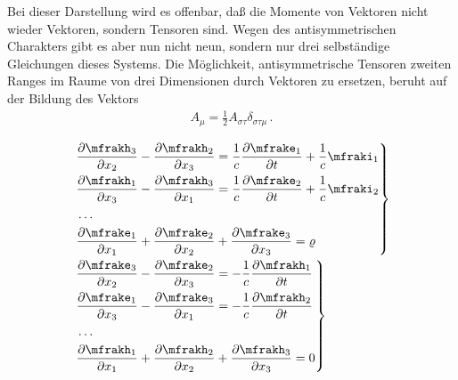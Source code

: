Bei dieser Darstellung wird es offenbar, daß die Momente von Vektoren nicht 
wieder Vektoren, sondern Tensoren sind. Wegen des antisymmetrischen Charakters 
gibt es aber nun nicht neun, sondern nur drei selbständige Gleichungen dieses 
Systems. Die Möglichkeit, antisymmetrische Tensoren zweiten Ranges im Raume
von drei Dimensionen durch Vektoren zu ersetzen, beruht auf der Bildung des 
Vektors
\begin{align*}
A_{\mu} = \frac{1}{2} A_{\sigma\tau} \delta_{\sigma\tau\mu}\,.
\end{align*}



\begin{align}
&\left.
\begin{aligned}
&\frpa{\mfrakh_3}{x_2} - \frpa{\mfrakh_2}{x_3} =
\frac{1}{c} \frpa{\mfrake_1}{t} + \frac{1}{c} \mfraki_1
\\
&\frpa{\mfrakh_1}{x_3} - \frpa{\mfrakh_3}{x_1} =
\frac{1}{c} \frpa{\mfrake_2}{t} + \frac{1}{c} \mfraki_2
\\
&\ldots
\\
&\frpa{\mfrake_1}{x_1} + \frpa{\mfrake_2}{x_2} + \frpa{\mfrake_3}{x_3} = \varrho
\end{aligned}
\right\}
\label{eq:19} \\
&\left.
\begin{aligned}
&\frpa{\mfrake_3}{x_2} - \frpa{\mfrake_2}{x_3} =
-\frac{1}{c} \frpa{\mfrakh_1}{t}
\\
&\frpa{\mfrake_1}{x_3} - \frpa{\mfrake_3}{x_1} =
-\frac{1}{c} \frpa{\mfrakh_2}{t}
\\
&\ldots
\\
&\frpa{\mfrakh_1}{x_1} + \frpa{\mfrakh_2}{x_2} + \frpa{\mfrakh_3}{x_3} = 0
\end{aligned}
\right\}
\label{eq:20}
\end{align}


